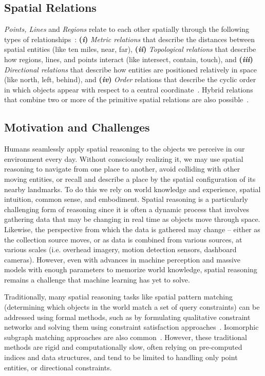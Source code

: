 \subsection{Spatial Relations}
\textit{Points, Lines} and \textit{Regions} relate to each other spatially through the following types of relationships~\cite{Carniel2020,Bertella2022,Carniel2023}: 
\textbf{(\textit{i})} \textit{Metric relations} that describe the distances between spatial entities (like ten miles, near, far), 
\textbf{(\textit{ii})} \textit{Topological relations} that describe how regions, lines, and points interact (like intersect, contain, touch), and 
\textbf{(\textit{iii})} \textit{Directional relations} that describe how entities are positioned relatively in space (like north, left, behind), and
\textbf{(\textit{iv})} \textit{Order} relations that describe the cyclic order in which objects appear with respect to a central coordinate~\cite{Schwering2014}.
%
Hybrid relations that combine two or more of the primitive spatial relations are also possible~\cite{Carniel2023}.



\subsection{Motivation and Challenges}
Humans seamlessly apply spatial reasoning to the objects we perceive in our environment every day.
Without consciously realizing it, we may use spatial reasoning to navigate from one place to another, avoid colliding with other moving entities, or recall and describe a place by the spatial configuration of its nearby landmarks.
To do this we rely on world knowledge and experience, spatial intuition, common sense, and embodiment.
Spatial reasoning is a particularly challenging form of reasoning since it is often a dynamic process that involves gathering data that may be changing in real time as objects move through space.
Likewise, the perspective from which the data is gathered may change -- either as the collection source moves, or as data is combined from various sources, at various scales (i.e. overhead imagery, motion detection sensors, dashboard cameras).
However, even with advances in machine perception and massive models with enough parameters to memorize world knowledge, spatial reasoning remains a challenge that machine learning has yet to solve.

Traditionally, many spatial reasoning tasks like spatial pattern matching (determining which objects in the world match a set of query constraints) can be addressed using formal methods, such as by formulating qualitative constraint networks and solving them using constraint satisfaction approaches~\cite{Papadias1998, Schwering2014, Duckham2023}.
Isomorphic subgraph matching approaches are also common~\cite{Folkers2000, Chen2019, Fang2019}.
However, these traditional methods are rigid and computationally slow, often relying on pre-computed indices and data structures, and tend to be limited to handling only point entities, or directional constraints.



